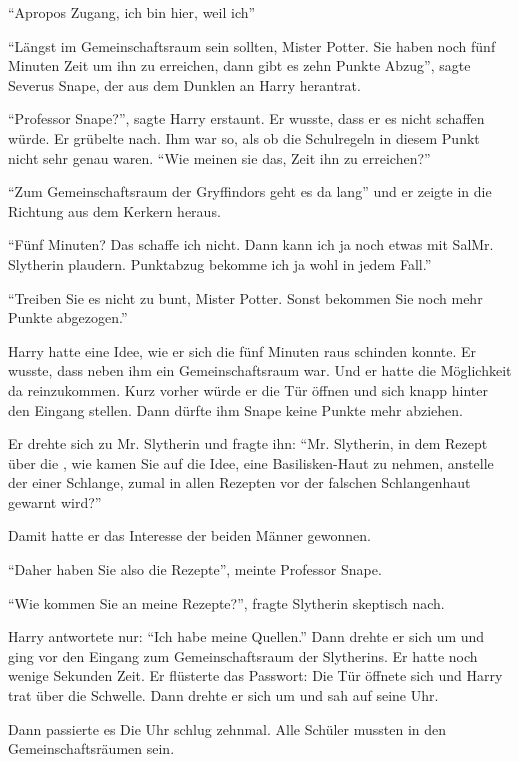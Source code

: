 \enquote{Apropos Zugang, ich bin hier, weil ich\abs}

\enquote{Längst im Gemeinschaftsraum sein sollten, Mister Potter. Sie haben noch fünf Minuten Zeit um ihn zu erreichen, dann gibt es zehn Punkte Abzug}, sagte Severus Snape, der aus dem Dunklen an Harry herantrat.

\enquote{Professor Snape?}, sagte Harry erstaunt. Er wusste, dass er es nicht schaffen würde. Er grübelte nach. Ihm war so, als ob die Schulregeln in diesem Punkt nicht sehr genau waren. \enquote{Wie meinen sie das, Zeit ihn zu erreichen?}

\enquote{Zum Gemeinschaftsraum der Gryffindors geht es da lang} und er zeigte in die Richtung aus dem Kerkern heraus.

\enquote{Fünf Minuten? Das schaffe ich nicht. Dann kann ich ja noch etwas mit Sal\aabs Mr. Slytherin plaudern. Punktabzug bekomme ich ja wohl in jedem Fall.}

\enquote{Treiben Sie es nicht zu bunt, Mister Potter. Sonst bekommen Sie noch mehr Punkte abgezogen.}

Harry hatte eine Idee, wie er sich die fünf Minuten raus schinden konnte. Er wusste, dass neben ihm ein Gemeinschaftsraum war. Und er hatte die Möglichkeit da reinzukommen. Kurz vorher würde er die Tür öffnen und sich knapp hinter den Eingang stellen. Dann dürfte ihm Snape keine Punkte mehr abziehen.

Er drehte sich zu Mr. Slytherin und fragte ihn: \enquote{Mr. Slytherin, in dem Rezept über die , wie kamen Sie auf die Idee, eine Basilisken-Haut zu nehmen, anstelle der einer Schlange, zumal in allen Rezepten vor der falschen Schlangenhaut gewarnt wird?}

Damit hatte er das Interesse der beiden Männer gewonnen.

\enquote{Daher haben Sie also die Rezepte}, meinte Professor Snape.

\enquote{Wie kommen Sie an meine Rezepte?}, fragte Slytherin skeptisch nach.

Harry antwortete nur: \enquote{Ich habe meine Quellen.} Dann drehte er sich um und ging vor den Eingang zum Gemeinschaftsraum der Slytherins. Er hatte noch wenige Sekunden Zeit. Er flüsterte das Passwort:  Die Tür öffnete sich und Harry trat über die Schwelle. Dann drehte er sich um und sah auf seine Uhr.

Dann passierte es  Die Uhr schlug zehnmal. Alle Schüler mussten in den Gemeinschaftsräumen sein.


